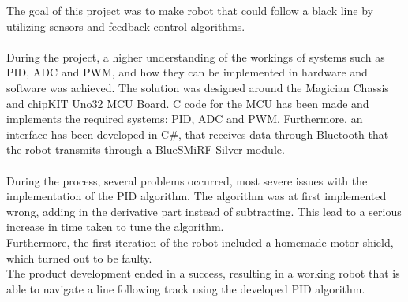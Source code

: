The goal of this project was to make robot that could follow a black line by utilizing sensors and feedback control algorithms.
\\\\
During the project, a higher understanding of the workings of systems such as PID, ADC and PWM, and how they can be implemented in hardware and software was achieved. 
The solution was designed around the Magician Chassis and chipKIT Uno32 MCU Board. 
C code for the MCU has been made and implements the required systems: PID, ADC and PWM. Furthermore, an interface has been developed in C\#, that receives data through Bluetooth that the robot transmits through a BlueSMiRF Silver module.
\\\\
During the process, several problems occurred, most severe issues with the implementation of the PID algorithm. The algorithm was at first implemented wrong, adding in the derivative part instead of subtracting. This lead to a serious increase in time taken to tune the algorithm.\\
Furthermore, the first iteration of the robot included a homemade motor shield, which turned out to be faulty.\\
The product development ended in a success, resulting in a working robot that is able to navigate a line following track using the developed PID algorithm. 